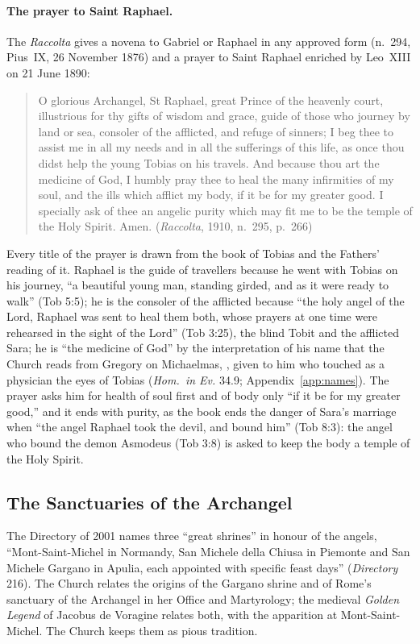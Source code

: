 \paragraph{The prayer to Saint Raphael.} The \emph{Raccolta} gives a
novena to Gabriel or Raphael in any approved form (n.~294, Pius~IX,
26 November 1876) and a prayer to Saint Raphael enriched by Leo~XIII on
21 June 1890:
\begin{quote}
O glorious Archangel, St Raphael, great Prince of the heavenly court,
illustrious for thy gifts of wisdom and grace, guide of those who journey
by land or sea, consoler of the afflicted, and refuge of sinners; I beg
thee to assist me in all my needs and in all the sufferings of this life,
as once thou didst help the young Tobias on his travels. And because thou
art the medicine of God, I humbly pray thee to heal the many infirmities
of my soul, and the ills which afflict my body, if it be for my greater
good. I specially ask of thee an angelic purity which may fit me to be
the temple of the Holy Spirit. Amen. (\emph{Raccolta}, 1910, n.~295,
p.~266)
\end{quote}
Every title of the prayer is drawn from the book of Tobias and the
Fathers' reading of it. Raphael is the guide of travellers because he went
with Tobias on his journey, ``a beautiful young man,
standing girded, and as it were ready to walk'' (Tob 5:5); he is the
consoler of the afflicted because ``the holy angel of the Lord, Raphael
was sent to heal them both, whose prayers at one time were rehearsed in
the sight of the Lord'' (Tob 3:25), the blind Tobit and the afflicted
Sara; he is ``the medicine of God'' by the interpretation of his name that
the Church reads from Gregory on Michaelmas, , given to him who touched as a physician the eyes of Tobias
(\emph{Hom.\ in Ev.} 34.9; Appendix~\ref{app:names}). The prayer asks
him for health of soul first and of body only ``if it be for my greater
good,'' and it ends with purity, as the book ends the danger of Sara's
marriage when ``the angel Raphael took the devil, and bound him'' (Tob
8:3): the angel who bound the demon Asmodeus (Tob 3:8) is asked to keep
the body a temple of the Holy Spirit.

\sectionguard
\subsection{The Sanctuaries of the Archangel}

The Directory of 2001 names three ``great shrines'' in honour of the
angels, ``Mont-Saint-Michel in Normandy, San Michele della Chiusa in
Piemonte and San Michele Gargano in Apulia, each appointed with specific
feast days'' (\emph{Directory} 216). The Church relates the origins of
the Gargano shrine and of Rome's sanctuary of the Archangel in her Office and
Martyrology; the medieval \emph{Golden Legend} of Jacobus de Voragine
relates both, with the apparition at Mont-Saint-Michel. The Church keeps them as pious
tradition.

